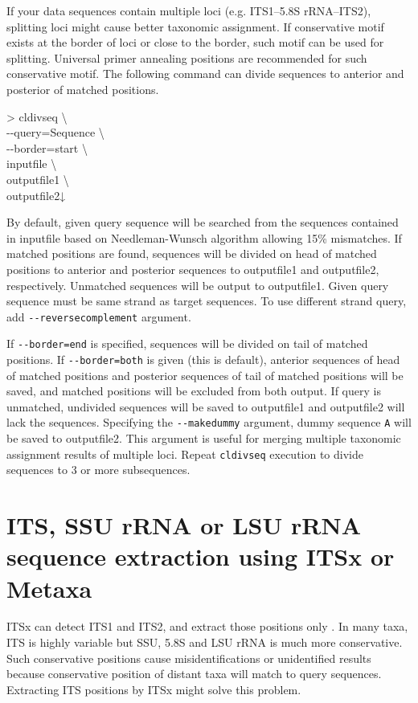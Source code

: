 \documentclass[titlepage,10pt,a4paper,english]{jsbook}
\newenvironment{cmd}{\begin{oframed}\raggedright\ttfamily\footnotesize\setlength{\baselineskip}{1.4em}}{\end{oframed}\vspace{-1em}}
\begin{document}
If your data sequences contain multiple loci (e.g. ITS1--5.8S rRNA--ITS2), splitting loci might cause better taxonomic assignment.
If conservative motif exists at the border of loci or close to the border, such motif can be used for splitting.
Universal primer annealing positions are recommended for such conservative motif.
The following command can divide sequences to anterior and posterior of matched positions.

\begin{cmd}
{\textgreater} cldivseq {\textbackslash}\\
{-}{-}query=Sequence {\textbackslash}\\
{-}{-}border=start {\textbackslash}\\
inputfile {\textbackslash}\\
outputfile1 {\textbackslash}\\
outputfile2↓
\end{cmd}

By default, given query sequence will be searched from the sequences contained in inputfile based on Needleman-Wunsch algorithm allowing 15\% mismatches.
If matched positions are found, sequences will be divided on head of matched positions to anterior and posterior sequences to outputfile1 and outputfile2, respectively.
Unmatched sequences will be output to outputfile1.
Given query sequence must be same strand as target sequences.
To use different strand query, add \texttt{{-}{-}reversecomplement} argument.

If \texttt{{-}{-}border=end} is specified, sequences will be divided on tail of matched positions.
If \texttt{{-}{-}border=both} is given (this is default), anterior sequences of head of matched positions and posterior sequences of tail of matched positions will be saved, and matched positions will be excluded from both output.
If query is unmatched, undivided sequences will be saved to outputfile1 and outputfile2 will lack the sequences.
Specifying the \texttt{{-}{-}makedummy} argument, dummy sequence \texttt{A} will be saved to outputfile2.
This argument is useful for merging multiple taxonomic assignment results of multiple loci.
Repeat \texttt{cldivseq} execution to divide sequences to 3 or more subsequences.

\section{ITS, SSU rRNA or LSU rRNA sequence extraction using ITSx or Metaxa}

ITSx can detect ITS1 and ITS2, and extract those positions only \citep{Bengtsson2013}.
In many taxa, ITS is highly variable but SSU, 5.8S and LSU rRNA is much more conservative.
Such conservative positions cause misidentifications or unidentified results because conservative position of distant taxa will match to query sequences.
Extracting ITS positions by ITSx might solve this problem.
\end{document}
